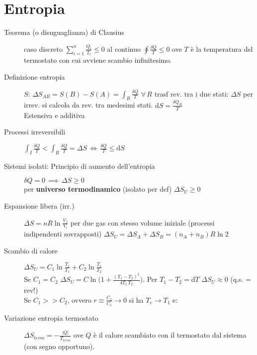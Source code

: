 \documentclass[10pt, oneside]{article}
\begin{document}
\section{Entropia}
\begin{description}
\item[\large Teorema (o disuguaglianza) di Clausius] caso discreto $\boxed{\displaystyle \sum\limits_{i=1}^n \frac{Q_i}{T_i} \leq 0}$ al continuo $\boxed{\displaystyle \oint \frac{\delta Q}{T} \leq 0}$ ove $T$ è la temperatura del termostato con cui avviene scambio infinitesimo.
\item[Definizione entropia] $S$: $\displaystyle \Delta S_{AB} = S(B) - S(A) = \int_R\frac{\delta Q}{T}$ $\forall \, R$ trasf rev. tra i due stati: $\Delta S$ per irrev. si calcola da rev. tra medesimi stati. $\displaystyle \mathrm{d}S = \frac{\delta Q_R}{T}$
\\Estensiva e additiva
\item[Processi irreversibili] $\displaystyle \int_I\frac{\delta Q}{T} < \int_R\frac{\delta Q}{T} = \Delta S \, \Leftrightarrow \, \frac{\delta Q}{T} \leq \mathrm{d}S$
\item[Sistemi isolati: \large Principio di aumento dell'entropia] $\delta Q = 0 \, \implies \, \Delta S \geq 0$ \\per \textbf{universo termodinamico} (isolato per def) $\displaystyle \Delta S_U \geq 0$
\item[Espansione libera (irr.)] $\displaystyle \Delta S = n R \ln \frac{V_f}{V_i}$ per due gas con stesso volume iniziale (processi indipendenti sovrapposti) $\displaystyle \Delta S_U = \Delta S_A + \Delta S_B = (n_A + n_B) R \ln2$
\item[Scambio di calore] $\displaystyle \Delta S_U = C_1 \ln \frac{T_e}{T_1} + C_2 \ln \frac{T_e}{T_2}$
\\Se $C_1 = C_2$ $\displaystyle \Delta S_U = C \ln \bigg(\displaystyle 1+ \frac{(T_1 - T_2)^2}{4 T_1 \, T_2}\bigg)$. Per $T_1 - T_2 = \mathrm{d}T$ $\Delta S_U 	\approx 0$ (q.s. = rev!)
\\Se $C_1 >> C_2$, ovvero $\displaystyle r \equiv \frac{C_2}{C_1} \rightarrow 0$ si ha $T_e \rightarrow T_1$ e:
\item[Variazione entropia termostato] $\displaystyle \Delta S_{term} = - \frac{|Q|}{T_{term}}$ ove $Q$ è il calore scambiato con il termostato dal sistema (con segno opportuno).
\end{description}
\end{document}
